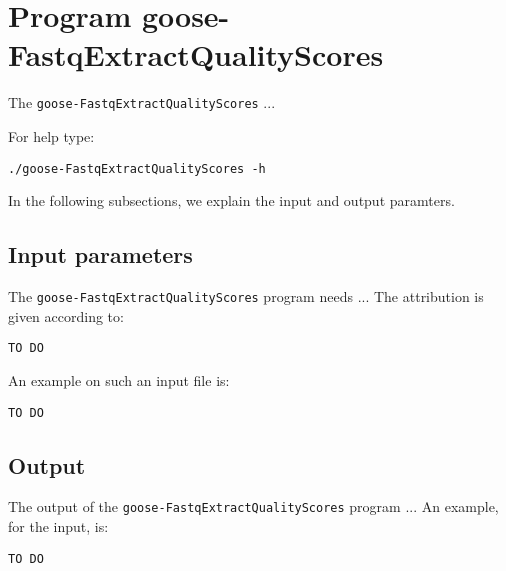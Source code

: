 \section{Program goose-FastqExtractQualityScores}
The \texttt{goose-FastqExtractQualityScores} ...

For help type:
\begin{lstlisting}
./goose-FastqExtractQualityScores -h
\end{lstlisting}
In the following subsections, we explain the input and output paramters.

\subsection{Input parameters}

The \texttt{goose-FastqExtractQualityScores} program needs ...
The attribution is given according to:
\begin{lstlisting}
TO DO
\end{lstlisting}

An example on such an input file is:
\begin{lstlisting}
TO DO
\end{lstlisting}

\subsection{Output}
The output of the \texttt{goose-FastqExtractQualityScores} program ...
An example, for the input, is:
\begin{lstlisting}
TO DO
\end{lstlisting}
